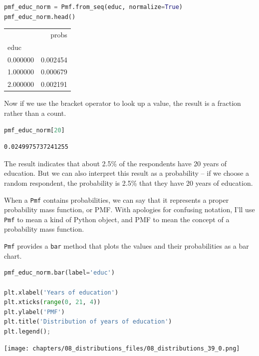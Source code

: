 \begin{lstlisting}[language=Python,style=source]
pmf_educ_norm = Pmf.from_seq(educ, normalize=True)
pmf_educ_norm.head()
\end{lstlisting}

\begin{tabular}{lr}
\midrule
 & probs \\
educ &  \\
\midrule
0.000000 & 0.002454 \\
1.000000 & 0.000679 \\
2.000000 & 0.002191 \\
\midrule
\end{tabular}

Now if we use the bracket operator to look up a value, the result is a
fraction rather than a count.

\begin{lstlisting}[language=Python,style=source]
pmf_educ_norm[20]
\end{lstlisting}

\begin{lstlisting}[style=output]
0.0249975737241255
\end{lstlisting}

The result indicates that about 2.5\% of the respondents have 20 years
of education. But we can also interpret this result as a probability --
if we choose a random respondent, the probability is 2.5\% that they
have 20 years of education.

When a \passthrough{\lstinline!Pmf!} contains probabilities, we can say
that it represents a proper probability mass function, or PMF. With
apologies for confusing notation, I'll use \passthrough{\lstinline!Pmf!}
to mean a kind of Python object, and PMF to mean the concept of a
probability mass function.

\passthrough{\lstinline!Pmf!} provides a \passthrough{\lstinline!bar!}
method that plots the values and their probabilities as a bar chart.

\begin{lstlisting}[language=Python,style=source]
pmf_educ_norm.bar(label='educ')

plt.xlabel('Years of education')
plt.xticks(range(0, 21, 4))
plt.ylabel('PMF')
plt.title('Distribution of years of education')
plt.legend();
\end{lstlisting}

\begin{center}
\texttt{[image: chapters/08\_distributions\_files/08\_distributions\_39\_0.png]}
\end{center}

